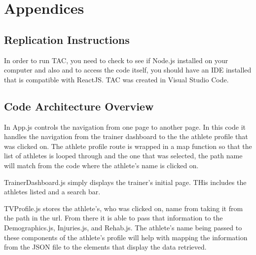 \documentclass[10pt,twocolumn]{article}
\begin{document}
\section{Appendices}
\subsection{Replication Instructions}
In order to run TAC, you need to check to see if Node.js installed on your computer and also and to access the code itself, you should have an IDE installed that is compatible with ReactJS. TAC was created in Visual Studio Code.

\subsection{Code Architecture Overview}
In App.js controls the navigation from one page to another page. In this code it handles the navigation from the trainer dashboard to the the athlete profile that was clicked on. The athlete profile route is wrapped in a map function so that the list of athletes is looped through and the one that was selected, the path name will match from the code where the athlete's name is clicked on. 

TrainerDashboard.js simply displays the trainer's initial page. THis includes the athletes listed and a search bar.

TVProfile.js stores the athlete's, who was clicked on, name from taking it from the path in the url. From there it is able to pass that information to the Demographics.js, Injuries.js, and Rehab.js. The athlete's name being passed to these components of the athlete's profile will help with mapping the information from the JSON file to the elements that display the data retrieved.

\printbibliography
\end{document}
